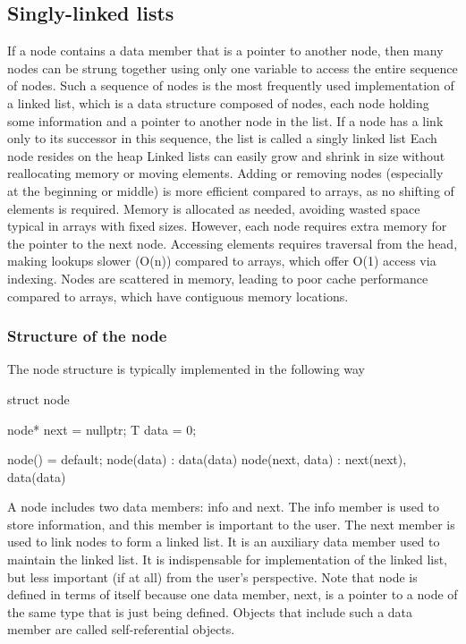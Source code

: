 \documentclass{report}
\begin{document}
    \pagebreak 
    \bigbreak \noindent 
    \subsection{Singly-linked lists}
    \bigbreak \noindent 
    If a node contains a data member that is a pointer to another node, then many nodes
    can be strung together using only one variable to access the entire sequence of nodes.
    Such a sequence of nodes is the most frequently used implementation of a linked list,
    which is a data structure composed of nodes, each node holding some information
    and a pointer to another node in the list. If a node has a link only to its successor in
    this sequence, the list is called a singly linked list
    \bigbreak \noindent 
    Each node resides on the heap
    \bigbreak \noindent 
    Linked lists can easily grow and shrink in size without reallocating memory or moving elements. Adding or removing nodes (especially at the beginning or middle) is more efficient compared to arrays, as no shifting of elements is required. Memory is allocated as needed, avoiding wasted space typical in arrays with fixed sizes.
    \bigbreak \noindent 
    However, each node requires extra memory for the pointer to the next node. Accessing elements requires traversal from the head, making lookups slower (O(n)) compared to arrays, which offer O(1) access via indexing.  Nodes are scattered in memory, leading to poor cache performance compared to arrays, which have contiguous memory locations.



    \bigbreak \noindent 
    \subsubsection{Structure of the node}
    \bigbreak \noindent 
    The node structure is typically implemented in the following way
    \bigbreak \noindent 
    \begin{cppcode}
        struct node {
            node* next = nullptr;
            T data = 0; 

            node() = default;
            node(data) : data(data) {}
            node(next, data) : next(next), data(data) {}
        }
    \end{cppcode}
    \bigbreak \noindent 
    A node includes two data members: info and next. The info member is used
    to store information, and this member is important to the user. The next member is
    used to link nodes to form a linked list. It is an auxiliary data member used to maintain the linked list. It is indispensable for implementation of the linked list, but less
    important (if at all) from the user’s perspective. Note that node is defined
    in terms of itself because one data member, next, is a pointer to a node of the same
    type that is just being defined. Objects that include such a data member are called
    self-referential objects.
\end{document}
